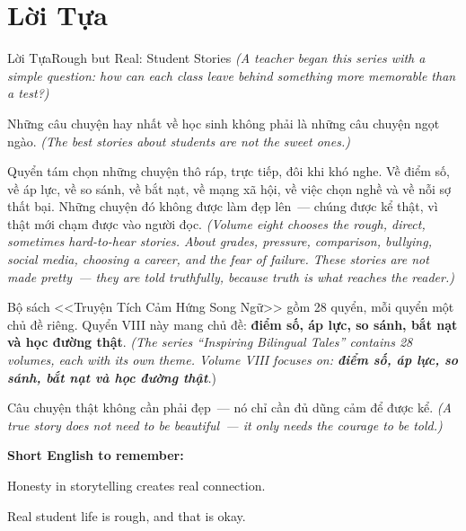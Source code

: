 \chapter*{Lời Tựa}

\begin{truyen}{Lời Tựa}{Rough but Real: Student Stories}
\textit{(A teacher began this series with a simple question: how can each class leave behind something more memorable than a test?)}

Những câu chuyện hay nhất về học sinh không phải là những câu chuyện ngọt ngào.
\textit{(The best stories about students are not the sweet ones.)}

Quyển tám chọn những chuyện thô ráp, trực tiếp, đôi khi khó nghe. Về điểm số, về áp lực, về so sánh, về bắt nạt, về mạng xã hội, về việc chọn nghề và về nỗi sợ thất bại. Những chuyện đó không được làm đẹp lên~--- chúng được kể thật, vì thật mới chạm được vào người đọc.
\textit{(Volume eight chooses the rough, direct, sometimes hard-to-hear stories. About grades, pressure, comparison, bullying, social media, choosing a career, and the fear of failure. These stories are not made pretty~--- they are told truthfully, because truth is what reaches the reader.)}

Bộ sách <<Truyện Tích Cảm Hứng Song Ngữ>> gồm 28 quyển, mỗi quyển một chủ đề riêng. Quyển VIII này mang chủ đề: \textbf{điểm số, áp lực, so sánh, bắt nạt và học đường thật}.
\textit{(The series ``Inspiring Bilingual Tales'' contains 28 volumes, each with its own theme. Volume VIII focuses on: \textbf{điểm số, áp lực, so sánh, bắt nạt và học đường thật}.})
\end{truyen}

\begin{baihoc}
Câu chuyện thật không cần phải đẹp~--- nó chỉ cần đủ dũng cảm để được kể.
\textit{(A true story does not need to be beautiful~--- it only needs the courage to be told.)}
\end{baihoc}

\begin{ghinhoanh}
\textbf{Short English to remember:}

Honesty in storytelling creates real connection.

Real student life is rough, and that is okay.
\end{ghinhoanh}

